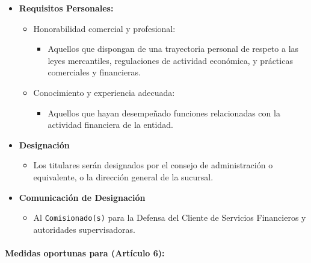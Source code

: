\documentclass[
]{article}
\providecommand{\tightlist}{%
  \setlength{\itemsep}{0pt}\setlength{\parskip}{0pt}}
\begin{document}
\begin{itemize}
\tightlist
\item
  \textbf{Requisitos Personales:}

  \begin{itemize}
  \tightlist
  \item
    Honorabilidad comercial y profesional:

    \begin{itemize}
    \tightlist
    \item
      Aquellos que dispongan de una trayectoria personal de respeto a
      las leyes mercantiles, regulaciones de actividad económica, y
      prácticas comerciales y financieras.
    \end{itemize}
  \item
    Conocimiento y experiencia adecuada:

    \begin{itemize}
    \tightlist
    \item
      Aquellos que hayan desempeñado funciones relacionadas con la
      actividad financiera de la entidad.
    \end{itemize}
  \end{itemize}
\item
  \textbf{Designación}

  \begin{itemize}
  \tightlist
  \item
    Los titulares serán designados por el consejo de administración o
    equivalente, o la dirección general de la sucursal.
  \end{itemize}
\item
  \textbf{Comunicación de Designación}

  \begin{itemize}
  \tightlist
  \item
    Al \texttt{Comisionado(s)} para la Defensa del Cliente de Servicios
    Financieros y autoridades supervisadoras.
  \end{itemize}
\end{itemize}

\hypertarget{medidas-oportunas-para-artuxedculo-6}{%
\paragraph{\texorpdfstring{Medidas oportunas para (\textbf{Artículo
6}):}{Medidas oportunas para (Artículo 6):}}\label{medidas-oportunas-para-artuxedculo-6}}
\end{document}
